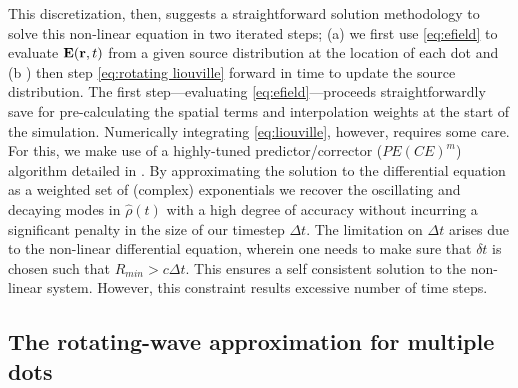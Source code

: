 \documentclass[conference]{IEEEtran}
\begin{document}
This discretization, then, suggests a straightforward solution methodology to solve this non-linear equation in two iterated steps; (a) we first use \cref{eq:efield} to evaluate $\vb{E}(\vb{r}, t)$ from a given source distribution at the location of each dot and (b ) then step \cref{eq:rotating liouville} forward in time to update the source distribution.
The first step---evaluating \cref{eq:efield}---proceeds straightforwardly save for pre-calculating the spatial terms and interpolation weights at the start of the simulation.
Numerically integrating \cref{eq:liouville}, however, requires some care.
For this, we make use of a highly-tuned predictor/corrector ($PE(CE)^m$) algorithm detailed in \cite{Glaser2009}. By approximating the solution to the differential equation as a weighted set of (complex) exponentials we recover the oscillating and decaying modes in $\hat{\rho}(t)$ with a high degree of accuracy without incurring a significant penalty in the size of our timestep $\Delta t$. The limitation on $\Delta t$ arises due to the non-linear differential equation, wherein one needs to make sure that $\delta t$ is chosen such that $R_{min}> c \Delta t$. This ensures a self consistent solution to the non-linear system. However, this constraint results excessive number of time steps. 

\subsection{The rotating-wave approximation for multiple dots}
\end{document}

